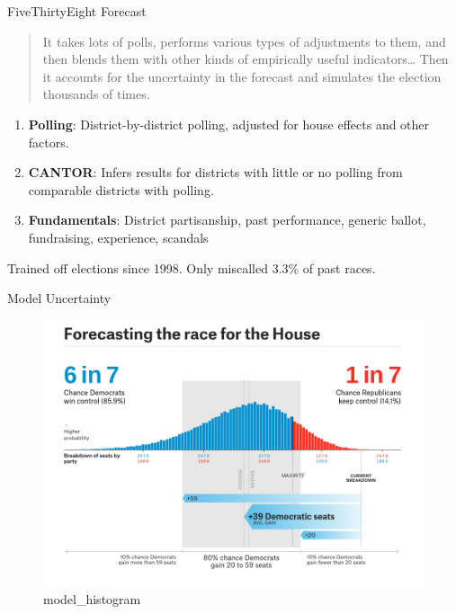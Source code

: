 \documentclass[ignorenonframetext,]{beamer}
\providecommand{\tightlist}{%
  \setlength{\itemsep}{0pt}\setlength{\parskip}{0pt}}
\begin{document}
\begin{frame}{FiveThirtyEight Forecast}

\begin{quote}
It takes lots of polls, performs various types of adjustments to them,
and then blends them with other kinds of empirically useful
indicators\ldots{} Then it accounts for the uncertainty in the forecast
and simulates the election thousands of times.
\end{quote}

\begin{enumerate}
\def\labelenumi{\arabic{enumi}.}
\tightlist
\item
  \textbf{Polling}: District-by-district polling, adjusted for house
  effects and other factors.
\item
  \textbf{CANTOR}: Infers results for districts with little or no
  polling from comparable districts with polling.
\item
  \textbf{Fundamentals}: District partisanship, past performance,
  generic ballot, fundraising, experience, scandals
\end{enumerate}

Trained off elections since 1998. Only miscalled 3.3\% of past races.

\end{frame}

\begin{frame}{Model Uncertainty}

\begin{figure}
\centering
\includegraphics{538_histogram.png}
\caption{model\_histogram}
\end{figure}

\end{frame}
\end{document}
